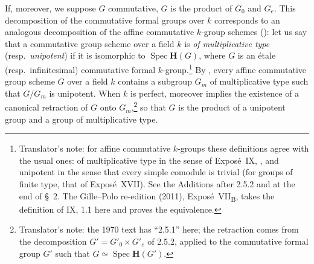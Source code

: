 If, moreover, we suppose \(G\) commutative, \(G\) is the product of
\(G_0\) and \(G_e\). This decomposition of the commutative formal groups
over \(k\) corresponds to an analogous decomposition of the affine
commutative \(k\)-group schemes \textup{()}: let us say that a commutative
group scheme over a field \(k\) is \emph{of multiplicative type}
\textup{(}resp.\ \emph{unipotent}\textup{)} if it is isomorphic to
\(\operatorname{Spec}\mathbf H(G)\), where \(G\) is an étale \textup{(}resp.\
infinitesimal\textup{)} commutative formal \(k\)-group.\footnote{Translator's note: for affine
commutative \(k\)-groups these definitions agree with the usual ones: of multiplicative type in the sense
of Expos\'e~IX, \SGARefLink{sga3:ix:definition:1:1}{1.1}, and unipotent in the sense that every simple comodule is
trivial (for groups of finite type, that of Expos\'e~XVII). See the Additions after 2.5.2 and at the end
of \S~2. The Gille--Polo re-edition (2011), Expos\'e~VII\textsubscript{B}, takes the definition of IX, 1.1
here and proves the equivalence.} By
, every affine commutative group scheme \(G\) over a field \(k\)
contains a subgroup \(G_m\) of multiplicative type such that \(G/G_m\)
is unipotent. When \(k\) is perfect,  moreover implies the
existence of a canonical retraction of \(G\) onto \(G_m\),\footnote{Translator's note: the 1970 text
has ``2.5.1'' here; the retraction comes from the decomposition \(G'=G'_0\times G'_e\) of 2.5.2, applied to
the commutative formal group \(G'\) such that \(G\simeq\operatorname{Spec}\mathbf H(G')\).} so that \(G\)
is the product of a unipotent group and a group of multiplicative
type.

